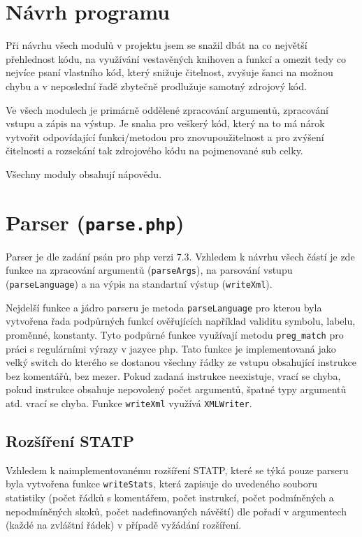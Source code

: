 \documentclass[a4paper,10pt]{article}
\begin{document}
\hfill

\section*{Návrh programu}
  Při návrhu všech modulů v projektu jsem se snažil dbát na co největší přehlednost kódu, na
  využívání vestavěných knihoven a funkcí a omezit tedy co nejvíce psaní vlastního kód, který snižuje
  čitelnost, zvyšuje šanci na možnou chybu a v neposlední řadě zbytečně prodlužuje samotný zdrojový kód.

  Ve všech modulech je primárně oddělené zpracování argumentů, zpracování vstupu a zápis na výstup.
  Je snaha pro veškerý kód, který na to má nárok vytvořit odpovídající funkci/metodou pro
  znovupoužitelnost a pro zvýšení čitelnosti a rozsekání tak zdrojového kódu na pojmenované sub celky.

  Všechny moduly obsahují nápovědu.

\section{Parser (\texttt{parse.php})}
  Parser je dle zadání psán pro php verzi 7.3. Vzhledem k návrhu všech částí je zde funkce na zpracování argumentů (\texttt{parseArgs}), na parsování vstupu (\texttt{parseLanguage}) a na výpis na standartní výstup (\texttt{writeXml}).

  Nejdelší funkce a jádro parseru je metoda \texttt{parseLanguage} pro kterou byla vytvořena řada podpůrných funkcí ověřujících například validitu symbolu, labelu, proměnné, konstanty. Tyto podpůrné funkce využívají metodu \texttt{preg_match} pro práci s regulárními výrazy v jazyce php.
  Tato funkce je implementovaná jako velký switch do kterého se dostanou všechny řádky ze vstupu obsahující instrukce bez komentářů, bez mezer. Pokud zadaná instrukce neexistuje, vrací se chyba, pokud instrukce obsahuje nepovolený počet argumentů, špatné typy argumentů atd. vrací se chyba.
  Funkce \texttt{writeXml} využívá \texttt{XMLWriter}.

\subsection{Rozšíření STATP}

  Vzhledem k naimplementovanému rozšíření STATP, které se týká pouze parseru byla vytvořena funkce \texttt{writeStats}, která zapisuje do uvedeného souboru statistiky (počet řádků s komentářem, počet instrukcí, počet podmíněných a nepodmíněných skoků, počet nadefinovaných návěští) dle pořadí v argumentech (každé na zvláštní řádek) v případě vyžádání rozšíření.
\end{document}
